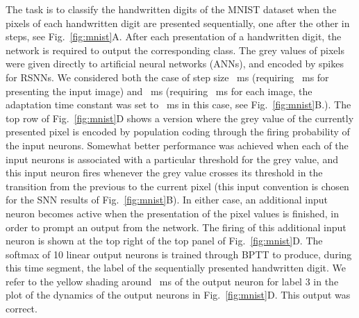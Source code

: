 \documentclass{article} \pdfoutput=1
\begin{document}
The task is to classify the handwritten digits of the MNIST dataset when the pixels of each handwritten digit are presented sequentially, one after the other in  steps, see Fig.~\ref{fig:mnist}A.
After each presentation of a handwritten digit, the network is required to output the corresponding class.
The grey values of pixels were given directly to artificial neural networks (ANNs), and encoded by spikes for RSNNs. We considered both the case of step size ~ms (requiring ~ms for presenting the input image) and ~ms (requiring ~ms for each image, the adaptation time constant  was set to ~ms in this case, see Fig.~\ref{fig:mnist}B.).
The top row of  Fig.~\ref{fig:mnist}D shows a version where the grey value of the currently presented pixel is encoded by population coding through the firing probability of the  input neurons.
Somewhat better performance was achieved when each of the  input neurons is associated with a particular threshold for the grey value, and this input neuron fires whenever the grey value crosses its threshold in the transition from the previous to the current pixel (this input convention is chosen for the SNN results of Fig.~\ref{fig:mnist}B).
In either case, an additional input neuron becomes active when the presentation of the  pixel values is finished, in order to prompt an output from the network.
The firing of this additional input neuron is shown at the top right of the top panel of Fig.~\ref{fig:mnist}D.
The softmax of 10 linear output neurons  is trained through BPTT to produce, during this time segment, the label of the sequentially presented handwritten digit.
We refer to the yellow shading around ~ms of the output neuron for label 3 in the plot of the dynamics of the output neurons  in Fig.~\ref{fig:mnist}D. This output was correct.
\end{document}
